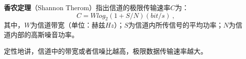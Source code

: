 

\textbf{香农定理}（Shannon Therom）指出信道的极限传输速率$C$为：
\begin{equation}
C=Wlog_2(1+S/N)    (bit/s)~,
\end{equation}
其中，$W$为信道带宽（单位：赫兹$Hz$）；$S$为信道内所传信号的平均功率；$N$为信道内部的高斯噪音功率。

定性地讲，信道中的带宽或者信噪比越高，极限数据传输速率越大。